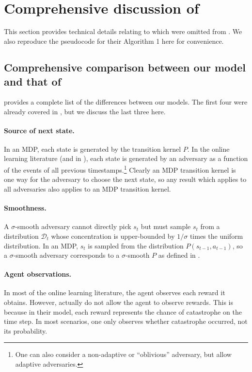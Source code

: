 \section{Comprehensive discussion of \citet{plaut_avoiding_2024}}\label{sec:ac-full}

This section provides technical details relating to \citet{plaut_avoiding_2024} which were omitted from . We also reproduce the pseudocode for their Algorithm 1 here for convenience.

\subsection{Comprehensive comparison between our model and that of \citet{plaut_avoiding_2024}}

 provides a complete list of the differences between our models. The first four were already covered in , but we discuss the last three here.


\paragraph{Source of next state.} In an MDP, each state is generated by the transition kernel $P$. In the online learning literature (and in \citet{plaut_avoiding_2024}), each state is generated by an adversary as a function of the events of all previous timestamps.\footnote{One can also consider a non-adaptive or ``oblivious'' adversary, but \citet{plaut_avoiding_2024} allow adaptive adversaries.} Clearly an MDP transition kernel is one way for the adversary to choose the next state, so any result which applies to all adversaries also applies to an MDP transition kernel.



\paragraph{Smoothness.} A $\sigma$-smooth adversary cannot directly pick $s_t$ but must sample $s_t$ from a distribution
$\mathcal{D}_t$ whose concentration is upper-bounded by $1/\sigma$ times the uniform distribution. In an MDP, $s_t$ is sampled from the distribution $P(s_{t-1}, a_{t-1})$, so a $\sigma$-smooth adversary corresponds to a $\sigma$-smooth $P$ as defined in .

\paragraph{Agent observations.} In most of the online learning literature, the agent observes each reward it obtains. However, \citet{plaut_avoiding_2024} actually do not allow the agent to observe rewards. This is because in their model, each reward represents the chance of catastrophe on the time step. In most scenarios, one only observes whether catastrophe occurred, not its probability. 

